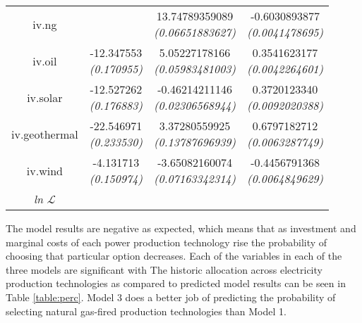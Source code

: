 \documentclass[10pt]{amsart}
\begin{document}
\begin{table}[H]
\begin{tabular}{c c c c}
iv.ng & & \makecell{13.74789359089 \\ {\footnotesize\textit{(0.06651883627)}}} & \makecell{-0.6030893877 \\ {\footnotesize\textit{(0.0041478695)}}} \\
iv.oil & \makecell{-12.347553 \\ {\footnotesize\textit{(0.170955)}}} & \makecell{5.05227178166 \\ {\footnotesize\textit{(0.05983481003)}}} & \makecell{0.3541623177 \\ {\footnotesize\textit{(0.0042264601)}}} \\
iv.solar & \makecell{-12.527262 \\ {\footnotesize\textit{(0.176883)}}} & \makecell{-0.46214211146 \\ {\footnotesize\textit{(0.02306568944)}}} & \makecell{0.3720123340 \\ {\footnotesize\textit{(0.0092020388)}}} \\
iv.geothermal & \makecell{-22.546971 \\ {\footnotesize\textit{(0.233530)}}} & \makecell{3.37280559925 \\ {\footnotesize\textit{(0.13787696939)}}} & \makecell{0.6797182712 \\ {\footnotesize\textit{(0.0063287749)}}} \\
iv.wind & \makecell{-4.131713 \\ {\footnotesize\textit{(0.150974)}}} & \makecell{-3.65082160074 \\ {\footnotesize\textit{(0.07163342314)}}} & \makecell{-0.4456791368 \\ {\footnotesize\textit{(0.0064849629)}}} \\ 
\hline
\textit{ln} $\mathcal{L}$ & & & \\ [1ex]
\hline
\hline
\end{tabular}
\label{table:nl.1}
\end{table}

The model results are negative as expected, which means that as investment and marginal costs of each power production technology rise the probability of choosing that particular option decreases. 
Each of the variables in each of the three models are significant with 
The historic allocation across electricity production technologies as compared to predicted model results can be seen in Table \ref{table:perc}.
Model 3 does a better job of predicting the probability of selecting natural gas-fired production technologies than Model 1.  
\end{document}
